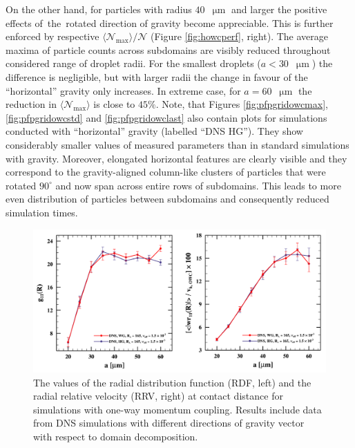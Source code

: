 \documentclass{pracamgren}
\begin{document}
On the other hand, for particles with radius $40$~$\upmu\text{m}$ and larger the positive effects of~the~rotated direction of gravity become appreciable.
This is further enforced by respective $\langle \mathcal{N}_{\max} \rangle / \mathcal{N}$ (Figure \ref{fig:howcperf}, right).
The average maxima of particle counts across subdomains are visibly reduced throughout considered range of droplet radii.
For the smallest droplets ($a < 30$~$\upmu\text{m}$) the difference is negligible, but with larger radii the change in favour of the ``horizontal'' gravity only increases.
In extreme case, for $a = 60$~$\upmu\text{m}$ the reduction in $\langle \mathcal{N}_{\max} \rangle$ is close to $45 \%$.
Note, that Figures \ref{fig:pfpgridowcmax}, \ref{fig:pfpgridowcstd} and \ref{fig:pfpgridowclast} also contain plots for simulations conducted with ``horizontal'' gravity (labelled ``DNS HG'').
They show considerably smaller values of measured parameters than in standard simulations with gravity.
Moreover, elongated horizontal features are clearly visible and they correspond to the gravity-aligned column-like clusters of particles that were rotated $90^{\circ}$ and now span across entire rows of subdomains.
This leads to more even distribution of particles between subdomains and consequently reduced simulation times.

\begin{figure}[!h]
\centering
\includegraphics[width=13.5cm]{img/plots/3-4e-howcrdfrrv.pdf}
\caption{
The values of the radial distribution function (RDF, left) and the radial relative velocity (RRV, right) at contact distance for simulations with one-way momentum coupling.
Results include data from DNS simulations with different directions of gravity vector with respect to domain decomposition.
}
\label{fig:howcrdfrrv}
\end{figure}
\end{document}
